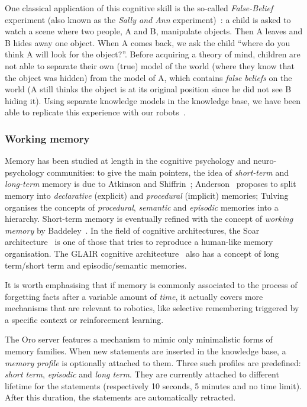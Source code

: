\documentclass[preprint,3p,times]{elsarticle}
\begin{document}
One classical application of this cognitive skill is the so-called
\emph{False-Belief} experiment (also known as the \emph{Sally and Ann}
experiment)~\cite{Leslie2000}: a child is asked to watch a scene where two
people, A and B, manipulate objects. Then A leaves and B hides away one
object. When A comes back, we ask the child ``where do you think A will
look for the object?''. Before acquiring a theory of mind, children are not
able to separate their own (true) model of the world (where they know that
the object was hidden) from the model of A, which contains \emph{false
beliefs} on the world (A still thinks the object is at its original
position since he did not see B hiding it). Using separate knowledge models
in the knowledge base, we have been able to replicate this experience with
our robots~\cite{warnier2012when}.

\subsubsection{Working memory}
\label{memory}

Memory has been studied at length in the cognitive psychology and
neuro-psychology communities: to give the main pointers, the idea of \emph{short-term} and
\emph{long-term} memory is due to Atkinson and Shiffrin~\cite{Atkinson1968};
Anderson~\cite{Anderson1976} proposes to split memory into \emph{declarative} (explicit)
and \emph{procedural} (implicit) memories; Tulving~\cite{Tulving1985} organises
the concepts of \emph{procedural}, \emph{semantic} and \emph{episodic} memories
into a hierarchy. Short-term memory is eventually refined with the concept of
\emph{working memory} by Baddeley~\cite{Baddeley2010}.
In the field of cognitive architectures, the {\sc Soar}
architecture~\cite{Lehman2006} is one of those that tries to reproduce a
human-like memory organisation. The GLAIR cognitive
architecture~\cite{Shapiro2009} also has a concept of long term/short term and
episodic/semantic memories.

It is worth emphasising that if memory is commonly associated to the process of
forgetting facts after a variable amount of \emph{time}, it actually covers
more mechanisms that are relevant to robotics, like selective remembering
triggered by a specific context or reinforcement learning.

The {\sc Oro} server features a mechanism to mimic only minimalistic forms of memory
families.  When new statements are inserted in the knowledge base, a
\emph{memory profile} is optionally attached to them.  Three such profiles are
predefined: {\it short term}, {\it episodic} and {\it long term}. They are
currently attached to different lifetime for the statements (respectively 10
seconds, 5 minutes and no time limit). After this duration, the statements are
automatically retracted.
\end{document}
